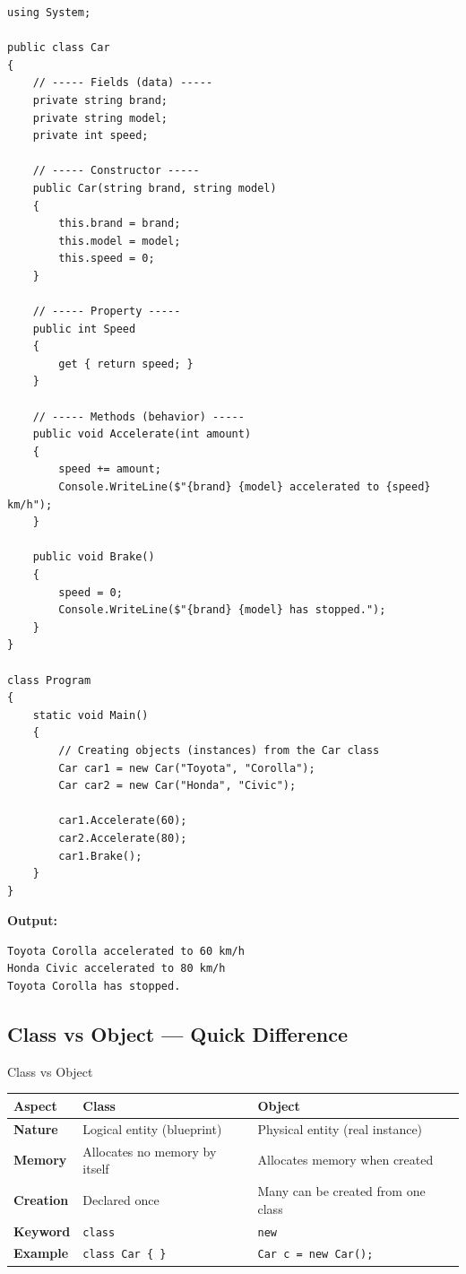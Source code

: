 \documentclass[11pt,a4paper]{article}
\newcommand{\rowcolortop}{\rowcolor{tableHead}\color{white}\bfseries}
\newcommand{\rowcolorlight}{\rowcolor{tableAlt}}
\begin{document}
\begin{lstlisting}[caption={A complete Car class in C\#}]
using System;

public class Car
{
    // ----- Fields (data) -----
    private string brand;
    private string model;
    private int speed;

    // ----- Constructor -----
    public Car(string brand, string model)
    {
        this.brand = brand;
        this.model = model;
        this.speed = 0;
    }

    // ----- Property -----
    public int Speed
    {
        get { return speed; }
    }

    // ----- Methods (behavior) -----
    public void Accelerate(int amount)
    {
        speed += amount;
        Console.WriteLine($"{brand} {model} accelerated to {speed} km/h");
    }

    public void Brake()
    {
        speed = 0;
        Console.WriteLine($"{brand} {model} has stopped.");
    }
}

class Program
{
    static void Main()
    {
        // Creating objects (instances) from the Car class
        Car car1 = new Car("Toyota", "Corolla");
        Car car2 = new Car("Honda", "Civic");

        car1.Accelerate(60);
        car2.Accelerate(80);
        car1.Brake();
    }
}
\end{lstlisting}

\textbf{Output:}
\begin{lstlisting}[style=output]
Toyota Corolla accelerated to 60 km/h
Honda Civic accelerated to 80 km/h
Toyota Corolla has stopped.
\end{lstlisting}

\subsection{Class vs Object — Quick Difference}

\begin{compareBox}{Class vs Object}
\begin{tabularx}{\linewidth}{|>{\bfseries}p{3.5cm}|X|X|}
\hline
\rowcolortop \color{white}Aspect & \color{white}Class & \color{white}Object \\
\hline
Nature & Logical entity (blueprint) & Physical entity (real instance) \\
\rowcolorlight
Memory & Allocates no memory by itself & Allocates memory when created \\
Creation & Declared once & Many can be created from one class \\
\rowcolorlight
Keyword & \texttt{class} & \texttt{new} \\
Example & \texttt{class Car \{ \}} & \texttt{Car c = new Car();} \\
\hline
\end{tabularx}
\end{compareBox}
\end{document}
